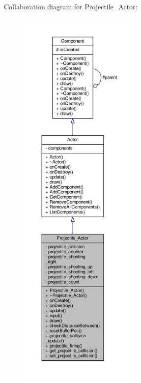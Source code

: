 Collaboration diagram for Projectile\+\_\+\+Actor\+:
\nopagebreak
\begin{figure}[H]
\begin{center}
\leavevmode
\includegraphics[height=550pt]{classProjectile__Actor__coll__graph}
\end{center}
\end{figure}
